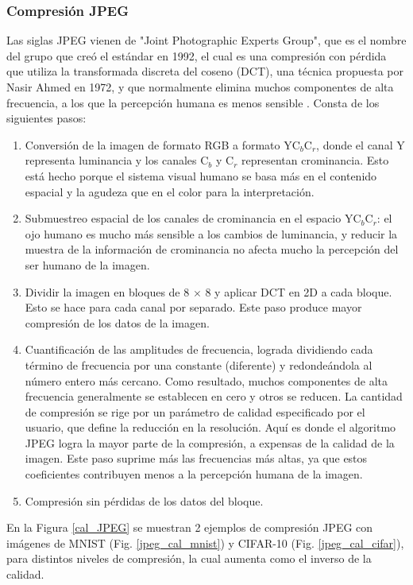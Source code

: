 \subsubsection{Compresión JPEG}

Las siglas JPEG vienen de "Joint Photographic Experts Group", que es el nombre del grupo que creó el estándar en 1992, el cual es una compresión con pérdida que utiliza la transformada discreta del coseno (DCT), una técnica propuesta por Nasir Ahmed en 1972, y que normalmente elimina muchos componentes de alta frecuencia, a los que la percepción humana es menos sensible \cite{das2017keeping, shaham2018defending}. Consta de los siguientes pasos:
\begin{enumerate}
    \item Conversión de la imagen de formato RGB a formato YC$_b$C$_r$, donde el canal Y representa luminancia y los canales C$_b$ y C$_r$ representan crominancia. Esto está hecho porque el sistema visual humano se basa más en el contenido espacial y la agudeza que en el color para la interpretación.
    \item Submuestreo espacial de los canales de crominancia en el espacio YC$_b$C$_r$: el ojo humano es mucho más sensible a los cambios de luminancia, y reducir la muestra de la información de crominancia no afecta mucho la percepción del ser humano de la imagen.
    \item Dividir la imagen en bloques de 8 $\times$ 8 y aplicar DCT en 2D a cada bloque. Esto se hace para cada canal por separado. Este paso produce mayor compresión de los datos de la imagen.
    \item Cuantificación de las amplitudes de frecuencia, lograda dividiendo cada término de frecuencia por una constante (diferente) y redondeándola al número entero más cercano. Como resultado, muchos componentes de alta frecuencia generalmente se establecen en cero y otros se reducen. La cantidad de compresión se rige por un parámetro de calidad especificado por el usuario, que define la reducción en la resolución. Aquí es donde el algoritmo JPEG logra la mayor parte de la compresión, a expensas de la calidad de la imagen. Este paso suprime más las frecuencias más altas, ya que estos coeficientes contribuyen menos a la percepción humana de la imagen.
    \item Compresión sin pérdidas de los datos del bloque.
\end{enumerate}

En la Figura \ref{cal_JPEG} se muestran 2 ejemplos de compresión JPEG con imágenes de MNIST (Fig. \ref{jpeg_cal_mnist}) y CIFAR-10 (Fig. \ref{jpeg_cal_cifar}), para distintos niveles de compresión, la cual aumenta como el inverso de la calidad.

